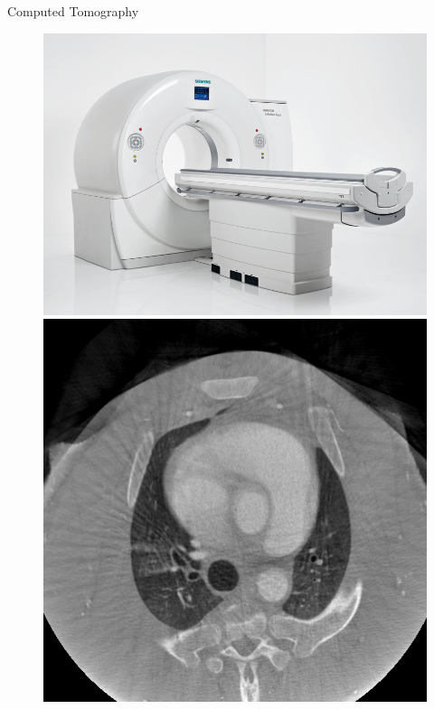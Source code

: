 \begin{frame}[c]{Computed Tomography}

	\begin{figure}
		\includegraphics[height=.4\linewidth]{images/ct-somatom-definition-flash3.png}
		\hspace*{.25cm}
		\includegraphics[height=.4\linewidth]{images/m1000-1000HU.png}
	\end{figure}
\end{frame}




